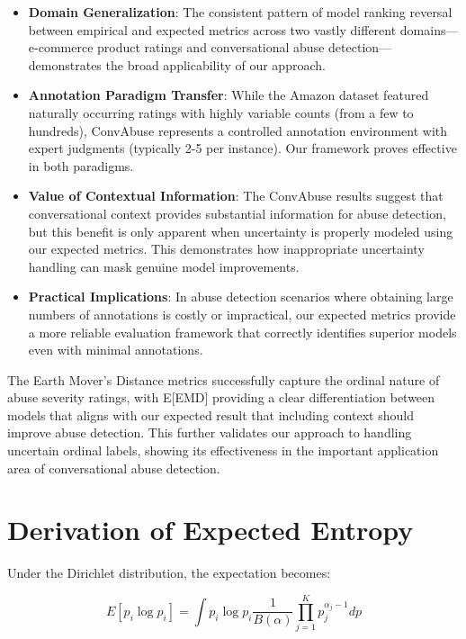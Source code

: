 \documentclass[journal]{IEEEtran}
\begin{document}
\begin{itemize}
    \item \textbf{Domain Generalization}: The consistent pattern of model ranking reversal between empirical and expected metrics across two vastly different domains—e-commerce product ratings and conversational abuse detection—demonstrates the broad applicability of our approach.
    
    \item \textbf{Annotation Paradigm Transfer}: While the Amazon dataset featured naturally occurring ratings with highly variable counts (from a few to hundreds), ConvAbuse represents a controlled annotation environment with expert judgments (typically 2-5 per instance). Our framework proves effective in both paradigms.
    
    \item \textbf{Value of Contextual Information}: The ConvAbuse results suggest that conversational context provides substantial information for abuse detection, but this benefit is only apparent when uncertainty is properly modeled using our expected metrics. This demonstrates how inappropriate uncertainty handling can mask genuine model improvements.
    
    \item \textbf{Practical Implications}: In abuse detection scenarios where obtaining large numbers of annotations is costly or impractical, our expected metrics provide a more reliable evaluation framework that correctly identifies superior models even with minimal annotations.
\end{itemize}

The Earth Mover's Distance metrics successfully capture the ordinal nature of abuse severity ratings, with E[EMD] providing a clear differentiation between models that aligns with our expected result that including context should improve abuse detection. This further validates our approach to handling uncertain ordinal labels, showing its effectiveness in the important application area of conversational abuse detection.


\section{Derivation of Expected Entropy}

Under the Dirichlet distribution, the expectation becomes:

\begin{equation}
E[p_i \log p_i] = \int p_i \log p_i \frac{1}{B(\alpha)} \prod_{j=1}^K p_j^{\alpha_j-1} dp
\end{equation}
\end{document}
